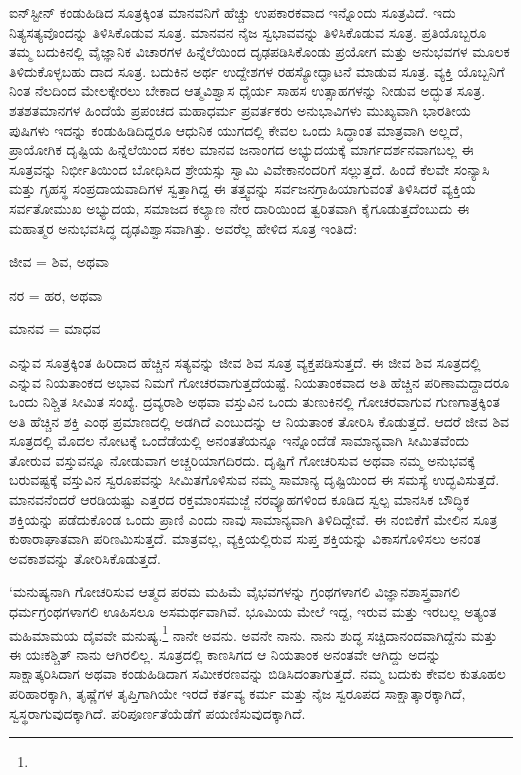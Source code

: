 ಐನ್​ಸ್ಟೀನ್ ಕಂಡುಹಿಡಿದ ಸೂತ್ರಕ್ಕಿಂತ ಮಾನವನಿಗೆ ಹೆಚ್ಚು ಉಪಕಾರಕವಾದ ಇನ್ನೊಂದು ಸೂತ್ರವಿದೆ. ಇದು ನಿತ್ಯಸತ್ಯವೊಂದನ್ನು ತಿಳಿಸಿಕೊಡುವ ಸೂತ್ರ. ಮಾನವನ ನೈಜ ಸ್ವಭಾವವನ್ನು ತಿಳಿಸಿಕೊಡುವ ಸೂತ್ರ. ಪ್ರತಿಯೊಬ್ಬರೂ ತಮ್ಮ ಬದುಕಿನಲ್ಲಿ ವೈಜ್ಞಾನಿಕ ವಿಚಾರಗಳ ಹಿನ್ನೆಲೆಯಿಂದ ದೃಢಪಡಿಸಿಕೊಂಡು ಪ್ರಯೋಗ ಮತ್ತು ಅನುಭವಗಳ ಮೂಲಕ ತಿಳಿದುಕೊಳ್ಳಬಹು ದಾದ ಸೂತ್ರ. ಬದುಕಿನ ಅರ್ಥ ಉದ್ದೇಶಗಳ ರಹಸ್ಯೋದ್ಘಾಟನೆ ಮಾಡುವ ಸೂತ್ರ. ವ್ಯಕ್ತಿ ಯೊಬ್ಬನಿಗೆ ನಿಂತ ನೆಲದಿಂದ ಮೇಲಕ್ಕೇರಲು ಬೇಕಾದ ಆತ್ಮವಿಶ್ವಾಸ ಧೈರ್ಯ ಸಾಹಸ ಉತ್ಸಾಹಗಳನ್ನು ನೀಡುವ ಅದ್ಭುತ ಸೂತ್ರ. ಶತಶತಮಾನಗಳ ಹಿಂದೆಯೆ ಪ್ರಪಂಚದ ಮಹಾಧರ್ಮ ಪ್ರವರ್ತಕರು ಅನುಭಾವಿಗಳು ಮುಖ್ಯವಾಗಿ ಭಾರತೀಯ ಪುಷಿಗಳು ಇದನ್ನು ಕಂಡುಹಿಡಿದಿದ್ದರೂ ಆಧುನಿಕ ಯುಗದಲ್ಲಿ ಕೇವಲ ಒಂದು ಸಿದ್ಧಾಂತ ಮಾತ್ರವಾಗಿ ಅಲ್ಲದೆ, ಪ್ರಾಯೋಗಿಕ ದೃಷ್ಟಿಯ ಹಿನ್ನೆಲೆಯಿಂದ ಸಕಲ ಮಾನವ ಜನಾಂಗದ ಅಭ್ಯುದಯಕ್ಕೆ ಮಾರ್ಗದರ್ಶನವಾಗಬಲ್ಲ ಈ ಸೂತ್ರವನ್ನು ನಿರ್ಭೀತಿಯಿಂದ ಬೋಧಿಸಿದ ಶ್ರೇಯಸ್ಸು ಸ್ವಾಮಿ ವಿವೇಕಾನಂದರಿಗೆ ಸಲ್ಲುತ್ತದೆ. ಹಿಂದೆ ಕೆಲವೇ ಸಂನ್ಯಾಸಿ ಮತ್ತು ಗೃಹಸ್ಥ ಸಂಪ್ರದಾಯವಾದಿಗಳ ಸ್ವತ್ತಾಗಿದ್ದ ಈ ತತ್ತ್ವವನ್ನು ಸರ್ವಜನಗ್ರಾಹಿಯಾಗುವಂತೆ ತಿಳಿಸಿದರೆ ವ್ಯಕ್ತಿಯ ಸರ್ವತೋಮುಖ ಅಭ್ಯುದಯ, ಸಮಾಜದ ಕಲ್ಯಾಣ ನೇರ ದಾರಿಯಿಂದ ತ್ವರಿತವಾಗಿ ಕೈಗೂಡುತ್ತದೆಂಬುದು ಈ ಮಹಾತ್ಮರ ಅನುಭವಸಿದ್ಧ ದೃಢವಿಶ್ವಾಸವಾಗಿತ್ತು. ಅವರೆಲ್ಲ ಹೇಳಿದ ಸೂತ್ರ ಇಂತಿದೆ:

ಜೀವ = ಶಿವ, ಅಥವಾ

ನರ = ಹರ, ಅಥವಾ

ಮಾನವ = ಮಾಧವ

ಎನ್ನುವ ಸೂತ್ರಕ್ಕಿಂತ ಹಿರಿದಾದ ಹೆಚ್ಚಿನ ಸತ್ಯವನ್ನು ಜೀವ ಶಿವ ಸೂತ್ರ ವ್ಯಕ್ತಪಡಿಸುತ್ತದೆ. ಈ ಜೀವ ಶಿವ ಸೂತ್ರದಲ್ಲಿ ಎನ್ನುವ ನಿಯತಾಂಕದ ಅಭಾವ ನಿಮಗೆ ಗೋಚರವಾಗುತ್ತದೆಯಷ್ಟೆ. ನಿಯತಾಂಕವಾದ ಅತಿ ಹೆಚ್ಚಿನ ಪರಿಣಾಮದ್ದಾದರೂ ಒಂದು ನಿಶ್ಚಿತ ಸೀಮಿತ ಸಂಖ್ಯೆ. ದ್ರವ್ಯರಾಶಿ ಅಥವಾ ವಸ್ತುವಿನ ಒಂದು ತುಣುಕಿನಲ್ಲಿ ಗೋಚರವಾಗುವ ಗುಣಗಾತ್ರಕ್ಕಿಂತ ಅತಿ ಹೆಚ್ಚಿನ ಶಕ್ತಿ ಎಂಥ ಪ್ರಮಾಣದಲ್ಲಿ ಅಡಗಿದೆ ಎಂಬುದನ್ನು ಆ ನಿಯತಾಂಕ ತೋರಿಸಿ ಕೊಡುತ್ತದೆ. ಆದರೆ ಜೀವ ಶಿವ ಸೂತ್ರದಲ್ಲಿ ಮೊದಲ ನೋಟಕ್ಕೆ ಒಂದೆಡೆಯಲ್ಲಿ ಅನಂತತೆಯನ್ನೂ ಇನ್ನೊಂದೆಡೆ ಸಾಮಾನ್ಯವಾಗಿ ಸೀಮಿತವೆಂದು ತೋರುವ ವಸ್ತುವನ್ನೂ ನೋಡುವಾಗ ಅಚ್ಚರಿಯಾಗದಿರದು. ದೃಷ್ಟಿಗೆ ಗೋಚರಿಸುವ ಅಥವಾ ನಮ್ಮ ಅನುಭವಕ್ಕೆ ಬರುವಷ್ಟಕ್ಕೆ ವಸ್ತುವಿನ ಸ್ವರೂಪವನ್ನು ಸೀಮಿತಗೊಳಿಸುವ ನಮ್ಮ ಸಾಮಾನ್ಯ ದೃಷ್ಟಿಯಿಂದ ಈ ಸಮಸ್ಯೆ ಉದ್ಭವಿಸುತ್ತದೆ. ಮಾನವನೆಂದರೆ ಆರಡಿಯಷ್ಟು ಎತ್ತರದ ರಕ್ತಮಾಂಸಮಜ್ಜೆ ನರವ್ಯೂಹಗಳಿಂದ ಕೂಡಿದ ಸ್ವಲ್ಪ ಮಾನಸಿಕ ಬೌದ್ಧಿಕ ಶಕ್ತಿಯನ್ನು ಪಡೆದುಕೊಂಡ ಒಂದು ಪ್ರಾಣಿ ಎಂದು ನಾವು ಸಾಮಾನ್ಯವಾಗಿ ತಿಳಿದಿದ್ದೇವೆ. ಈ ನಂಬಿಕೆಗೆ ಮೇಲಿನ ಸೂತ್ರ ಕುಠಾರಾಘಾತವಾಗಿ ಪರಿಣಮಿಸುತ್ತದೆ. ಮಾತ್ರವಲ್ಲ, ವ್ಯಕ್ತಿಯಲ್ಲಿರುವ ಸುಪ್ತ ಶಕ್ತಿಯನ್ನು ವಿಕಾಸಗೊಳಿಸಲು ಅನಂತ ಅವಕಾಶವನ್ನು ತೋರಿಸಿಕೊಡುತ್ತದೆ.

‘ಮನುಷ್ಯನಾಗಿ ಗೋಚರಿಸುವ ಆತ್ಮದ ಪರಮ ಮಹಿಮೆ ವೈಭವಗಳನ್ನು ಗ್ರಂಥಗಳಾಗಲಿ ವಿಜ್ಞಾನಶಾಸ್ತ್ರವಾಗಲಿ ಧರ್ಮಗ್ರಂಥಗಳಾಗಲಿ ಊಹಿಸಲೂ ಅಸಮರ್ಥವಾಗಿವೆ. ಭೂಮಿಯ ಮೇಲೆ ಇದ್ದ, ಇರುವ ಮತ್ತು ಇರಬಲ್ಲ ಅತ್ಯಂತ ಮಹಿಮಾಮಯ ದೈವವೇ ಮನುಷ್ಯ.\footnote{\hfill{}} ನಾನೇ ಅವನು. ಅವನೇ ನಾನು. ನಾನು ಶುದ್ಧ ಸಚ್ಚಿದಾನಂದವಾಗಿದ್ದೆನು ಮತ್ತು ಈ ಯಃಕಶ್ಚಿತ್ ನಾನು ಆಗಿರಲಿಲ್ಲ. ಸೂತ್ರದಲ್ಲಿ ಕಾಣಸಿಗದ ಆ ನಿಯತಾಂಕ ಅನಂತವೇ ಆಗಿದ್ದು ಅದನ್ನು ಸಾಕ್ಷಾತ್ಕರಿಸಿದಾಗ ಅಥವಾ ಕಂಡುಹಿಡಿದಾಗ ಸಮೀಕರಣವನ್ನು ಬಿಡಿಸಿದಂತಾಗುತ್ತದೆ. ನಮ್ಮ ಬದುಕು ಕೇವಲ ಕುತೂಹಲ ಪರಿಹಾರಕ್ಕಾಗಿ, ತೃಷ್ಣೆಗಳ ತೃಪ್ತಿಗಾಗಿಯೇ ಇರದೆ ಕರ್ತವ್ಯ ಕರ್ಮ ಮತ್ತು ನೈಜ ಸ್ವರೂಪದ ಸಾಕ್ಷಾತ್ಕಾರಕ್ಕಾಗಿದೆ, ಸ್ವಸ್ಥರಾಗುವುದಕ್ಕಾಗಿದೆ. ಪರಿಪೂರ್ಣತೆಯೆಡೆಗೆ ಪಯಣಿಸುವುದಕ್ಕಾಗಿದೆ.

